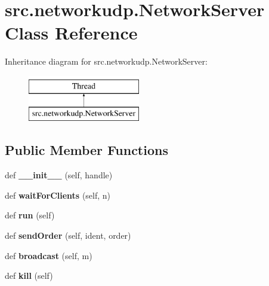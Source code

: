 \hypertarget{classsrc_1_1networkudp_1_1_network_server}{}\section{src.\+networkudp.\+Network\+Server Class Reference}
\label{classsrc_1_1networkudp_1_1_network_server}
Inheritance diagram for src.\+networkudp.\+Network\+Server\+:\begin{figure}[H]
\begin{center}
\leavevmode
\includegraphics[height=2.000000cm]{classsrc_1_1networkudp_1_1_network_server}
\end{center}
\end{figure}
\subsection*{Public Member Functions}
\begin{DoxyCompactItemize}
\item 
\hypertarget{classsrc_1_1networkudp_1_1_network_server_a962dd5cdf7ccdbb1d9f78f1f275ff7b8}{}\label{classsrc_1_1networkudp_1_1_network_server_a962dd5cdf7ccdbb1d9f78f1f275ff7b8} 
def {\bfseries \+\_\+\+\_\+init\+\_\+\+\_\+} (self, handle)
\item 
\hypertarget{classsrc_1_1networkudp_1_1_network_server_a459f08ec108aec939c09fa3d629114c1}{}\label{classsrc_1_1networkudp_1_1_network_server_a459f08ec108aec939c09fa3d629114c1} 
def {\bfseries wait\+For\+Clients} (self, n)
\item 
\hypertarget{classsrc_1_1networkudp_1_1_network_server_a3d71e96c5377438c70e5a7fbaf9534dc}{}\label{classsrc_1_1networkudp_1_1_network_server_a3d71e96c5377438c70e5a7fbaf9534dc} 
def {\bfseries run} (self)
\item 
\hypertarget{classsrc_1_1networkudp_1_1_network_server_a65e58a649b2e3c0788184df8977f364a}{}\label{classsrc_1_1networkudp_1_1_network_server_a65e58a649b2e3c0788184df8977f364a} 
def {\bfseries send\+Order} (self, ident, order)
\item 
\hypertarget{classsrc_1_1networkudp_1_1_network_server_a8a444d4dc2519abd6b44146897b24931}{}\label{classsrc_1_1networkudp_1_1_network_server_a8a444d4dc2519abd6b44146897b24931} 
def {\bfseries broadcast} (self, m)
\item 
\hypertarget{classsrc_1_1networkudp_1_1_network_server_a95703a5b326bd9f422fbd5e1ac3851a5}{}\label{classsrc_1_1networkudp_1_1_network_server_a95703a5b326bd9f422fbd5e1ac3851a5} 
def {\bfseries kill} (self)
\end{DoxyCompactItemize}
